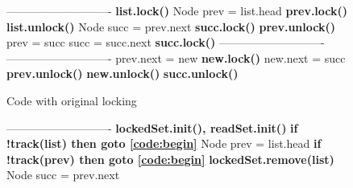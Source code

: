 \newcommand{\spOne}{\hspace{-3mm}\ }
\newcommand{\spZero}{\hspace{-3mm}}
\begin{figure*}
\scriptsize
	\begin{center}
	\begin{subfigure}[t]{.45\textwidth}
		\begin{algorithmic}[1]{}
		{\ttfamily
			 \label{code:begin}
			\Statex ----------------------------
			\State                               \label{code:beginRead}
            \State{\spOne}\textbf{list.lock()}
			\State{\spOne}Node prev = list.head
			\State{\spOne}\textbf{prev.lock()}
            \State{\spOne}\textbf{list.unlock()}
			\State{\spOne}Node succ = prev.next
			\State{\spOne}\textbf{succ.lock()}
			\State{\spOne}\textbf{prev.unlock()}
			\State{\spZero}prev = succ
			\State{\spZero}succ = succ.next
			\State{\spZero}\textbf{succ.lock()}  \label{code:endRead}
			\Statex ----------------------------
			\State                               \label{code:beginValidation}
			\State
			\State
			\State
			\State
			\State
            \State                               \label{code:endValidation}
			\Statex ----------------------------
			\State{\spZero}prev.next = new       \label{code:beginUpdate}
			\State{\spZero}\textbf{new.lock()}
			\State{\spZero}new.next = succ
            \State
			\State{\spZero}\textbf{prev.unlock()}
            \State
			\State{\spZero}\textbf{new.unlock()}
            \State
			\State{\spZero}\textbf{succ.unlock()}  \label{code:endUpdate}
			\EndFunction
			}
		\end{algorithmic}
		\caption{Code with original locking} \label{figure:transformation:before}
	\end{subfigure}
	\begin{subfigure}[t]{.45\textwidth}
		\begin{algorithmic}[1]{}
		{\ttfamily
			 \label{code:begin}
			\Statex ----------------------------
			\Comment{\textrm{read-only phase}}
            \State{\spOne}\textbf{lockedSet.init(), readSet.init()} \label{code:initSets}
            \State{\spOne}\textbf{if !track(list)  then {goto} \ref{code:begin}} \label{code:readGhaseGoto0}
			\State{\spOne}Node prev = list.head
			\State{\spOne}\textbf{if !track(prev)  then {goto} \ref{code:begin}} \label{code:readGhaseGoto1}
            \State{\spOne}\textbf{lockedSet.remove(list)} \label{code:lockedSet:remove1}
			\State{\spOne}Node succ = prev.next
}
\end{algorithmic}
\end{subfigure}
\end{center}
\end{figure*}
